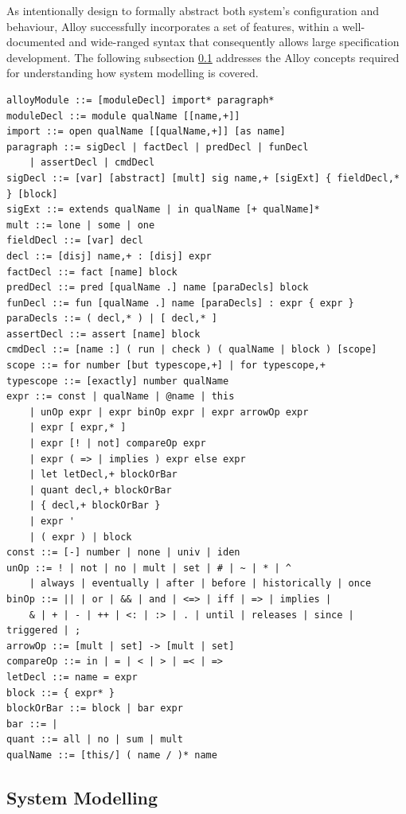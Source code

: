 As intentionally design to formally abstract both system's configuration and behaviour, Alloy successfully incorporates a set of features, within a well-documented and wide-ranged syntax that consequently allows large specification development. \cite{carvalho2020analysis} The following subsection \ref{c:alloy-sm} addresses the Alloy concepts required for understanding how system modelling is covered. 


\newpage 

\begin{lstlisting}[title={Alloy's syntax.}]
alloyModule ::= [moduleDecl] import* paragraph*
moduleDecl ::= module qualName [[name,+]]
import ::= open qualName [[qualName,+]] [as name]
paragraph ::= sigDecl | factDecl | predDecl | funDecl
    | assertDecl | cmdDecl
sigDecl ::= [var] [abstract] [mult] sig name,+ [sigExt] { fieldDecl,* } [block]
sigExt ::= extends qualName | in qualName [+ qualName]*
mult ::= lone | some | one
fieldDecl ::= [var] decl
decl ::= [disj] name,+ : [disj] expr
factDecl ::= fact [name] block
predDecl ::= pred [qualName .] name [paraDecls] block
funDecl ::= fun [qualName .] name [paraDecls] : expr { expr }
paraDecls ::= ( decl,* ) | [ decl,* ]
assertDecl ::= assert [name] block
cmdDecl ::= [name :] ( run | check ) ( qualName | block ) [scope]
scope ::= for number [but typescope,+] | for typescope,+
typescope ::= [exactly] number qualName
expr ::= const | qualName | @name | this
    | unOp expr | expr binOp expr | expr arrowOp expr
    | expr [ expr,* ]
    | expr [! | not] compareOp expr
    | expr ( => | implies ) expr else expr
    | let letDecl,+ blockOrBar
    | quant decl,+ blockOrBar
    | { decl,+ blockOrBar }
    | expr '
    | ( expr ) | block
const ::= [-] number | none | univ | iden
unOp ::= ! | not | no | mult | set | # | ~ | * | ^ 
    | always | eventually | after | before | historically | once
binOp ::= || | or | && | and | <=> | iff | => | implies | 
    & | + | - | ++ | <: | :> | . | until | releases | since | triggered | ;
arrowOp ::= [mult | set] -> [mult | set]
compareOp ::= in | = | < | > | =< | =>
letDecl ::= name = expr
block ::= { expr* }
blockOrBar ::= block | bar expr
bar ::= |
quant ::= all | no | sum | mult
qualName ::= [this/] ( name / )* name
\end{lstlisting}

\newpage

\subsection{System Modelling}\label{c:alloy-sm}

